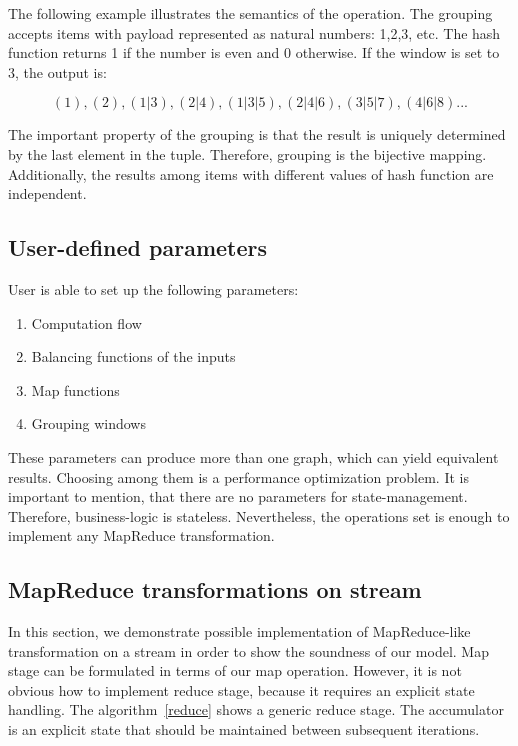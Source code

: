 The following example illustrates the semantics of the operation. The grouping accepts items with payload represented as natural numbers: 1,2,3, etc. The hash function returns 1 if the number is even and 0 otherwise. If the window is set to 3, the output is:

\[(1), (2), (1|3), (2|4), (1|3|5), (2|4|6), (3|5|7), (4|6|8)...\]

The important property of the grouping is that the result is uniquely determined by the last element in the tuple. Therefore, grouping is the bijective mapping. Additionally, the results among items with different values of hash function are independent.

\subsection{User-defined parameters}

User is able to set up the following parameters:

\begin{enumerate}
  \item{Computation flow}
  \item{Balancing functions of the inputs}
  \item{Map functions}
  \item{Grouping windows}
\end{enumerate}

These parameters can produce more than one graph, which can yield equivalent results. Choosing among them is a performance optimization problem.    
It is important to mention, that there are no parameters for state-management. Therefore, business-logic is stateless. Nevertheless, the operations set is enough to implement any MapReduce transformation.

\subsection{MapReduce transformations on stream}

In this section, we demonstrate possible implementation of MapReduce-like transformation on a stream in order to show the soundness of our model. Map stage can be formulated in terms of our map operation. However, it is not obvious how to implement reduce stage, because it requires an explicit state handling. The algorithm~\ref{reduce} shows a generic reduce stage. The accumulator is an explicit state that should be maintained between subsequent iterations.

